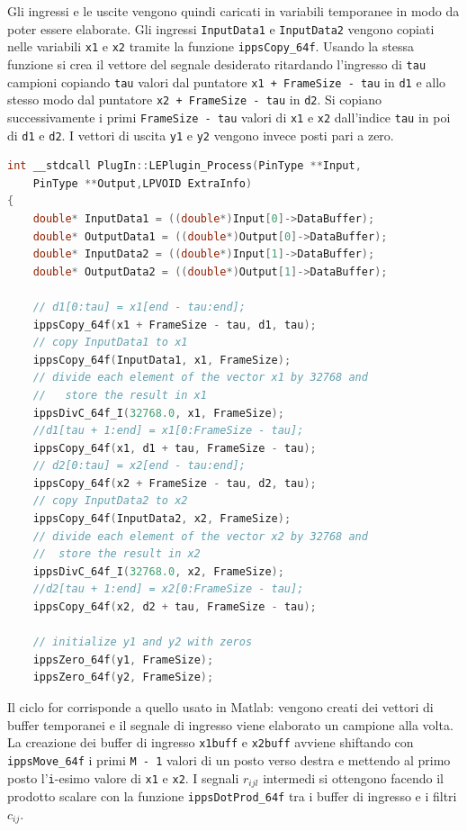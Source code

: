 \documentclass[12pt,a4paper,titlepage]{article}
\begin{document}
Gli ingressi e le uscite vengono quindi caricati in variabili temporanee in modo da poter essere elaborate.
Gli ingressi \texttt{InputData1} e \texttt{InputData2} vengono copiati nelle variabili \texttt{x1} e \texttt{x2} tramite la funzione \texttt{ippsCopy\_64f}.
Usando la stessa funzione si crea il vettore del segnale desiderato ritardando l’ingresso di \texttt{tau} campioni copiando \texttt{tau} valori dal puntatore \texttt{x1 + FrameSize - tau} in \texttt{d1} e  allo stesso modo dal puntatore \texttt{x2 + FrameSize - tau} in \texttt{d2}. Si copiano successivamente i primi \texttt{FrameSize - tau} valori di \texttt{x1} e \texttt{x2} dall'indice \texttt{tau} in poi di \texttt{d1} e \texttt{d2}.
I vettori di uscita \texttt{y1} e \texttt{y2} vengono invece posti pari a zero.
\begin{lstlisting}[language=cpp, label=code:proc, caption = Process, breaklines = false, captionpos = b]
int __stdcall PlugIn::LEPlugin_Process(PinType **Input,
	PinType **Output,LPVOID ExtraInfo)
{ 
	double* InputData1 = ((double*)Input[0]->DataBuffer);
	double* OutputData1 = ((double*)Output[0]->DataBuffer);
	double* InputData2 = ((double*)Input[1]->DataBuffer);
	double* OutputData2 = ((double*)Output[1]->DataBuffer);

	// d1[0:tau] = x1[end - tau:end];
	ippsCopy_64f(x1 + FrameSize - tau, d1, tau);
	// copy InputData1 to x1
	ippsCopy_64f(InputData1, x1, FrameSize);
	// divide each element of the vector x1 by 32768 and
	//	 store the result in x1
	ippsDivC_64f_I(32768.0, x1, FrameSize);
	//d1[tau + 1:end] = x1[0:FrameSize - tau];	
	ippsCopy_64f(x1, d1 + tau, FrameSize - tau);
	// d2[0:tau] = x2[end - tau:end];
	ippsCopy_64f(x2 + FrameSize - tau, d2, tau);
	// copy InputData2 to x2
	ippsCopy_64f(InputData2, x2, FrameSize);
	// divide each element of the vector x2 by 32768 and 
	//	store the result in x2
	ippsDivC_64f_I(32768.0, x2, FrameSize);
	//d2[tau + 1:end] = x2[0:FrameSize - tau];	
	ippsCopy_64f(x2, d2 + tau, FrameSize - tau);
	
	// initialize y1 and y2 with zeros
	ippsZero_64f(y1, FrameSize);
	ippsZero_64f(y2, FrameSize);
\end{lstlisting}
Il ciclo for corrisponde a quello usato in Matlab: vengono creati dei vettori di buffer temporanei e il segnale di ingresso viene elaborato un campione alla volta. La creazione dei buffer di ingresso \texttt{x1buff} e \texttt{x2buff} avviene shiftando con \texttt{ippsMove\_64f} i primi \texttt{M - 1} valori di un posto verso destra e mettendo al primo posto l'\texttt{i}-esimo valore di \texttt{x1} e \texttt{x2}. I segnali $r_{ijl}$ intermedi si ottengono facendo il prodotto scalare con la funzione \texttt{ippsDotProd\_64f} tra i buffer di ingresso e i filtri $c_{ij}$.
\end{document}
